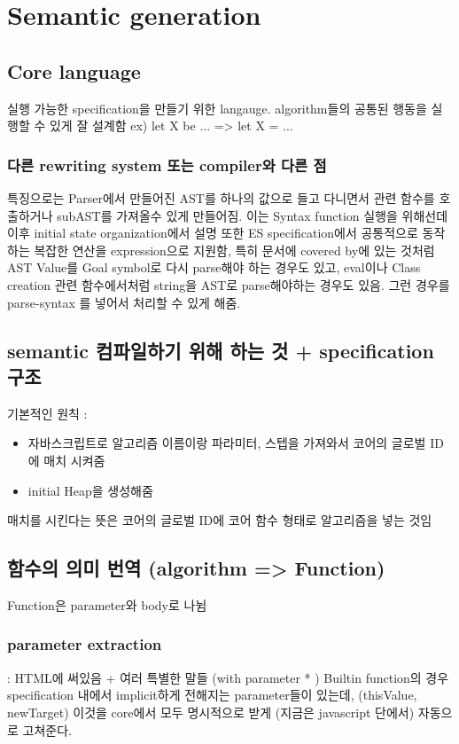 \section{Semantic generation}

\subsection{Core language}
실행 가능한 specification을 만들기 위한 langauge.
algorithm들의 공통된 행동을 실행할 수 있게 잘 설계함
ex) let X be ... => let X = ...

\subsubsection{다른 rewriting system 또는 compiler와 다른 점}
특징으로는 Parser에서 만들어진 AST를 하나의 값으로 들고 다니면서 관련 함수를 호출하거나 subAST를 가져올수 있게 만들어짐. 이는 Syntax function 실행을 위해선데 이후 initial state organization에서 설명 
또한 ES specification에서 공통적으로 동작하는 복잡한 연산을 expression으로 지원함, 특히 문서에 covered by에 있는 것처럼 AST Value를 Goal symbol로 다시 parse해야 하는 경우도 있고, eval이나 Class creation 관련 함수에서처럼 string을 AST로 parse해야하는 경우도 있음. 그런 경우를 parse-syntax 를 넣어서 처리할 수 있게
해줌.

\subsection{semantic 컴파일하기 위해 하는 것 + specification 구조}
기본적인 원칙 :
\begin{itemize} 
\item 자바스크립트로 알고리즘 이름이랑 파라미터, 스텝을 가져와서 코어의 글로벌 ID에 매치 시켜줌
\item initial Heap을 생성해줌
\end{itemize}
매치를 시킨다는 뜻은 코어의 글로벌 ID에 코어 함수 형태로 알고리즘을 넣는 것임

\subsection{함수의 의미 번역 (algorithm => Function)}
Function은 parameter와 body로 나뉨
\subsubsection{parameter extraction} : HTML에 써있음 + 여러 특별한 말들 (with parameter * )
Builtin function의 경우 specification 내에서 implicit하게 전해지는 parameter들이 있는데, (thisValue, newTarget) 이것을
core에서 모두 명시적으로 받게 (지금은 javascript 단에서) 자동으로 고쳐준다.


